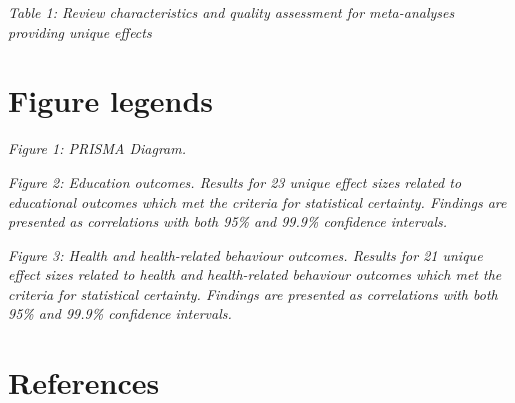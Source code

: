 \documentclass[
  english,
  man]{apa6}
\begin{document}
\emph{Table 1: Review characteristics and quality assessment for meta-analyses providing unique effects}

\hypertarget{figure-legends}{%
\section{Figure legends}\label{figure-legends}}

\emph{Figure 1: PRISMA Diagram.}

\emph{Figure 2: Education outcomes. Results for 23 unique effect sizes related to educational outcomes which met the criteria for statistical certainty. Findings are presented as correlations with both 95\% and 99.9\% confidence intervals.}

\emph{Figure 3: Health and health-related behaviour outcomes. Results for 21 unique effect sizes related to health and health-related behaviour outcomes which met the criteria for statistical certainty. Findings are presented as correlations with both 95\% and 99.9\% confidence intervals.}

\newpage

\hypertarget{references}{%
\section{References}\label{references}}
\end{document}
